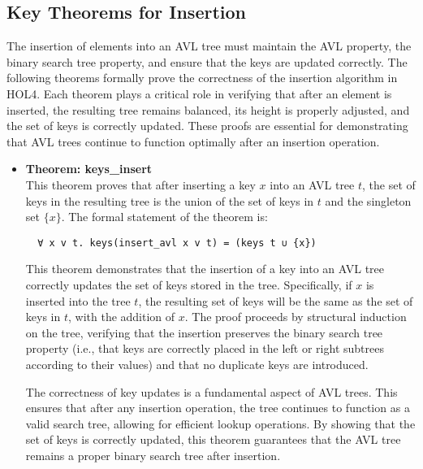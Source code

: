 \documentclass[12pt]{article}
\begin{document}
\subsection{Key Theorems for Insertion}

The insertion of elements into an AVL tree must maintain the AVL property, the binary search tree property, and ensure that the keys are updated correctly. The following theorems formally prove the correctness of the insertion algorithm in HOL4. Each theorem plays a critical role in verifying that after an element is inserted, the resulting tree remains balanced, its height is properly adjusted, and the set of keys is correctly updated. These proofs are essential for demonstrating that AVL trees continue to function optimally after an insertion operation.

\begin{itemize}

  \item \textbf{Theorem: keys\_insert} \\
  This theorem proves that after inserting a key \( x \) into an AVL tree \( t \), the set of keys in the resulting tree is the union of the set of keys in \( t \) and the singleton set \( \{x\} \). The formal statement of the theorem is:
  \begin{verbatim}
  ∀ x v t. keys(insert_avl x v t) = (keys t ∪ {x})
  \end{verbatim}
  This theorem demonstrates that the insertion of a key into an AVL tree correctly updates the set of keys stored in the tree. Specifically, if \( x \) is inserted into the tree \( t \), the resulting set of keys will be the same as the set of keys in \( t \), with the addition of \( x \). The proof proceeds by structural induction on the tree, verifying that the insertion preserves the binary search tree property (i.e., that keys are correctly placed in the left or right subtrees according to their values) and that no duplicate keys are introduced.

  The correctness of key updates is a fundamental aspect of AVL trees. This ensures that after any insertion operation, the tree continues to function as a valid search tree, allowing for efficient lookup operations. By showing that the set of keys is correctly updated, this theorem guarantees that the AVL tree remains a proper binary search tree after insertion.


\end{itemize}
\end{document}
